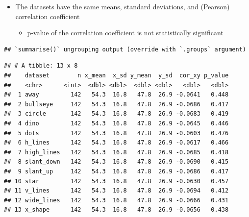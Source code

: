 \documentclass[
]{article}
\newenvironment{Shaded}{\begin{snugshade}}{\end{snugshade}}
\newcommand{\CommentTok}[1]{\textcolor[rgb]{0.56,0.35,0.01}{\textit{#1}}}
\newcommand{\DataTypeTok}[1]{\textcolor[rgb]{0.13,0.29,0.53}{#1}}
\newcommand{\KeywordTok}[1]{\textcolor[rgb]{0.13,0.29,0.53}{\textbf{#1}}}
\newcommand{\NormalTok}[1]{#1}
\newcommand{\OperatorTok}[1]{\textcolor[rgb]{0.81,0.36,0.00}{\textbf{#1}}}
\newcommand{\StringTok}[1]{\textcolor[rgb]{0.31,0.60,0.02}{#1}}
\providecommand{\tightlist}{%
  \setlength{\itemsep}{0pt}\setlength{\parskip}{0pt}}
\begin{document}
\begin{itemize}
\tightlist
\item
  The datasets have the same means, standard deviations, and (Pearson) correlation coefficient

  \begin{itemize}
  \tightlist
  \item
    p-value of the correlation coefficient is not statistically significant
  \end{itemize}
\end{itemize}

\begin{Shaded}
\end{Shaded}

\begin{verbatim}
## `summarise()` ungrouping output (override with `.groups` argument)
\end{verbatim}

\begin{verbatim}
## # A tibble: 13 x 8
##    dataset        n x_mean  x_sd y_mean  y_sd  cor_xy p_value
##    <chr>      <int>  <dbl> <dbl>  <dbl> <dbl>   <dbl>   <dbl>
##  1 away         142   54.3  16.8   47.8  26.9 -0.0641   0.448
##  2 bullseye     142   54.3  16.8   47.8  26.9 -0.0686   0.417
##  3 circle       142   54.3  16.8   47.8  26.9 -0.0683   0.419
##  4 dino         142   54.3  16.8   47.8  26.9 -0.0645   0.446
##  5 dots         142   54.3  16.8   47.8  26.9 -0.0603   0.476
##  6 h_lines      142   54.3  16.8   47.8  26.9 -0.0617   0.466
##  7 high_lines   142   54.3  16.8   47.8  26.9 -0.0685   0.418
##  8 slant_down   142   54.3  16.8   47.8  26.9 -0.0690   0.415
##  9 slant_up     142   54.3  16.8   47.8  26.9 -0.0686   0.417
## 10 star         142   54.3  16.8   47.8  26.9 -0.0630   0.457
## 11 v_lines      142   54.3  16.8   47.8  26.9 -0.0694   0.412
## 12 wide_lines   142   54.3  16.8   47.8  26.9 -0.0666   0.431
## 13 x_shape      142   54.3  16.8   47.8  26.9 -0.0656   0.438
\end{verbatim}
\end{document}
